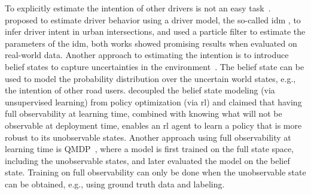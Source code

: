 To explicitly estimate the intention of other drivers is not an easy task~\cite{Amsalu2017}. 
\citet{Liebner2012} proposed to estimate driver behavior using a driver model, the so-called \gls{idm} \cite{idm2000}, to infer driver intent in urban intersections, and \citet{Hoermann2017} used a particle filter to estimate the parameters of the \gls{idm}, both works showed promising results when evaluated on real-world data. 
Another approach to estimating the intention is to introduce belief states to capture uncertainties in the environment~\cite{Bouton2017}. The belief state can be used to model the probability distribution over the uncertain world states, e.g., the intention of other road users.  decoupled the belief state modeling (via unsupervised learning) from policy optimization (via \gls{rl}) and claimed that having full observability at learning time, combined with knowing what will not be observable at deployment time, enables an \gls{rl} agent to learn a policy that is more robust to its unobservable states. Another approach using full observability at learning time is QMDP~\cite{Littman1995}, where a model is first trained on the full state space, including the unobservable states, and later evaluated the model on the belief state. Training on full observability can only be done when the unobservable state can be obtained, e.g., using ground truth data and labeling.

%         


